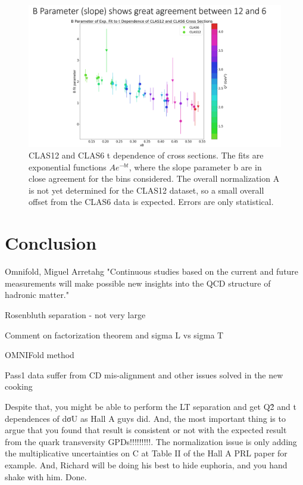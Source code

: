     
    \begin{figure}[hbt]
    	\centering
    	\includegraphics[trim={0 0 0 2.2cm},clip,width=0.8\linewidth]{Chapters/Ch5-Further/t_dependence/pics/bslopes.png}
    
    	\caption[Bslopes]{CLAS12 and CLAS6 t dependence of cross sections. The fits are exponential functions $Ae^{-bt}$, where the slope parameter b are in close agreement for the bins considered. The overall normalization A is not yet determined for the CLAS12 dataset, so a small overall offset from the CLAS6 data is expected. Errors are only statistical.}
    	\label{fig:bslopes}
    \end{figure}

%    

\clearpage
\section{Conclusion}
    Omnifold, Miguel Arretahg
     "Continuous
    studies based on the current and future measurements will make possible new insights
    into the QCD structure of hadronic matter."
    
    Rosenbluth separation - not very large
    
    
    Comment on factorization theorem and sigma L vs sigma T
    
    OMNIFold method
    
    Pass1 data suffer from CD mis-alignment and other issues solved in the new cooking
    
    
    Despite that, you might be able to perform the LT separation and get Q\^2 and t dependences of dσU as Hall A guys did. And, the most important thing is to argue that you found that result is consistent or not with the expected result from the quark transversity GPDs!!!!!!!!!. The normalization issue is only adding the multiplicative uncertainties on C at Table II of the Hall A PRL paper for example. And, Richard will be doing his best to hide euphoria, and you hand shake with him. Done.
    
